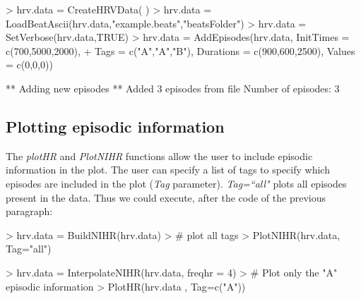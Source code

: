 \documentclass[12pt,lot, lof]{puthesis}
\begin{document}
\begin{Schunk}
\begin{Sinput}
> hrv.data = CreateHRVData( )
> hrv.data = LoadBeatAscii(hrv.data,"example.beats","beatsFolder")
> hrv.data = SetVerbose(hrv.data,TRUE)
> hrv.data = AddEpisodes(hrv.data, InitTimes = c(700,5000,2000),
+ Tags = c("A","A","B"), Durations = c(900,600,2500), Values = c(0,0,0))
\end{Sinput}
\begin{Soutput}
** Adding new episodes **
   Added 3 episodes from file
   Number of episodes: 3 
\end{Soutput}
\end{Schunk}


\subsection{Plotting episodic information} The \textit{plotHR} and  
\textit{PlotNIHR} functions allow the user to include episodic information in 
the plot. The user can specify a list of tags to specify which episodes are 
included in the plot (\textit{Tag} parameter). \textit{Tag=``all"} plots all 
episodes present in the data. Thus we could execute, after the code of the 
previous paragraph:
\begin{Schunk}
\begin{Sinput}
> hrv.data = BuildNIHR(hrv.data)
> # plot all tags
> PlotNIHR(hrv.data, Tag="all")
\end{Sinput}
\end{Schunk}
\begin{Schunk}
\begin{Sinput}
> hrv.data  = InterpolateNIHR(hrv.data, freqhr = 4)
> # Plot only the "A" episodic information 
> PlotHR(hrv.data , Tag=c("A"))
\end{Sinput}
\end{Schunk}
\end{document}
